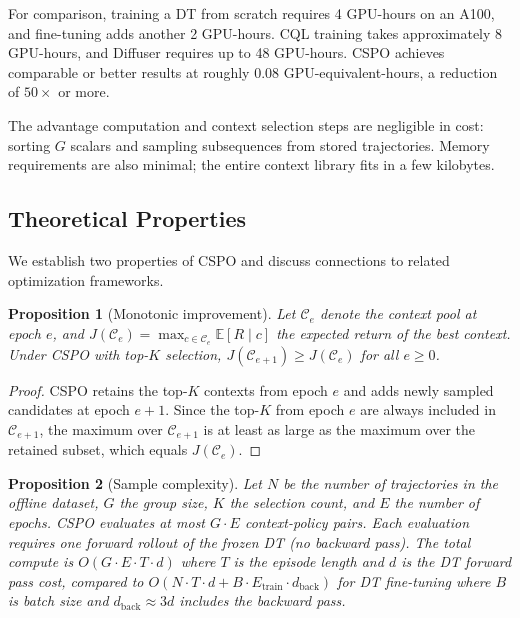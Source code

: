 \documentclass{article}
\newtheorem{proposition}{Proposition}
\newcommand{\cspo}{\textsc{CSPO}}
\newcommand{\EE}{\mathbb{E}}
\newcommand{\cC}{\mathcal{C}}
\begin{document}
For comparison, training a DT from scratch requires 4 GPU-hours on an A100, and fine-tuning adds another 2 GPU-hours. CQL training takes approximately 8 GPU-hours, and Diffuser requires up to 48 GPU-hours. \cspo{} achieves comparable or better results at roughly 0.08 GPU-equivalent-hours, a reduction of $50\times$ or more.

The advantage computation and context selection steps are negligible in cost: sorting $G$ scalars and sampling subsequences from stored trajectories. Memory requirements are also minimal; the entire context library fits in a few kilobytes.

\subsection{Theoretical Properties}
\label{sec:theory}

We establish two properties of \cspo{} and discuss connections to related optimization frameworks.

\begin{proposition}[Monotonic improvement]
\label{prop:monotonic}
Let $\cC_e$ denote the context pool at epoch $e$, and $J(\cC_e) = \max_{c \in \cC_e} \EE[R \mid c]$ the expected return of the best context. Under \cspo{} with top-$K$ selection, $J(\cC_{e+1}) \geq J(\cC_e)$ for all $e \geq 0$.
\end{proposition}

\begin{proof}
\cspo{} retains the top-$K$ contexts from epoch $e$ and adds newly sampled candidates at epoch $e+1$. Since the top-$K$ from epoch $e$ are always included in $\cC_{e+1}$, the maximum over $\cC_{e+1}$ is at least as large as the maximum over the retained subset, which equals $J(\cC_e)$.
\end{proof}

\begin{proposition}[Sample complexity]
\label{prop:complexity}
Let $N$ be the number of trajectories in the offline dataset, $G$ the group size, $K$ the selection count, and $E$ the number of epochs. \cspo{} evaluates at most $G \cdot E$ context-policy pairs. Each evaluation requires one forward rollout of the frozen DT (no backward pass). The total compute is $O(G \cdot E \cdot T \cdot d)$ where $T$ is the episode length and $d$ is the DT forward pass cost, compared to $O(N \cdot T \cdot d + B \cdot E_{\text{train}} \cdot d_{\text{back}})$ for DT fine-tuning where $B$ is batch size and $d_{\text{back}} \approx 3d$ includes the backward pass.
\end{proposition}
\end{document}
